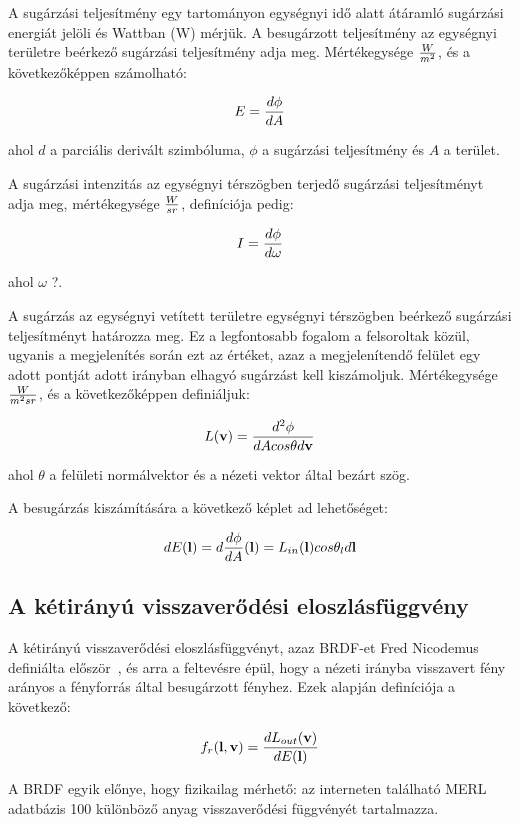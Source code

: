A sugárzási teljesítmény egy tartományon egységnyi idő alatt átáramló sugárzási energiát jelöli és Wattban (W) mérjük. A besugárzott teljesítmény az egységnyi területre beérkező sugárzási teljesítmény adja meg. Mértékegysége \(W \over m^2\), és a következőképpen számolható:

\[
E = { { d\phi } \over { dA } }
\]

ahol \(d\) a parciális derivált szimbóluma, \(\phi\) a sugárzási teljesítmény és \(A\) a terület.

A sugárzási intenzitás az egységnyi térszögben terjedő sugárzási teljesítményt adja meg, mértékegysége \(W \over {sr}\), definíciója pedig:

\[
I = { { d\phi } \over { d\omega } }
\]

ahol \(\omega\) ?.

A sugárzás az egységnyi vetített területre egységnyi térszögben beérkező sugárzási teljesítményt határozza meg. Ez a legfontosabb fogalom a felsoroltak közül, ugyanis a megjelenítés során ezt az értéket, azaz a megjelenítendő felület egy adott pontját adott irányban elhagyó sugárzást kell kiszámoljuk. Mértékegysége \(W \over {m^2sr}\), és a következőképpen definiáljuk:

\[
L(\mathbf{v}) = { { d^2\phi } \over { dA cos\theta d\mathbf{v} } }
\]

ahol \(\theta\) a felületi normálvektor és a nézeti vektor által bezárt szög.

A besugárzás kiszámítására a következő képlet ad lehetőséget:

\[
dE(\mathbf{l}) = d { {d\phi} \over {dA} } (\mathbf{l}) = L_{in}(\mathbf{l}) cos\theta_l d\mathbf{l}
\]

\subsection{A kétirányú visszaverődési eloszlásfüggvény}

A kétirányú visszaverődési eloszlásfüggvényt, azaz BRDF-et Fred Nicodemus definiálta először~\cite{nicodemus1965directional}, és arra a feltevésre épül, hogy a nézeti irányba visszavert fény arányos a fényforrás által besugárzott fényhez. Ezek alapján definíciója a következő:

\[
f_r(\mathbf{l}, \mathbf{v}) = { { dL_{out}(\mathbf{v}) } \over {dE(\mathbf{l})} }
\]

A BRDF egyik előnye, hogy fizikailag mérhető: az interneten található MERL adatbázis 100 különböző anyag visszaverődési függvényét tartalmazza.

